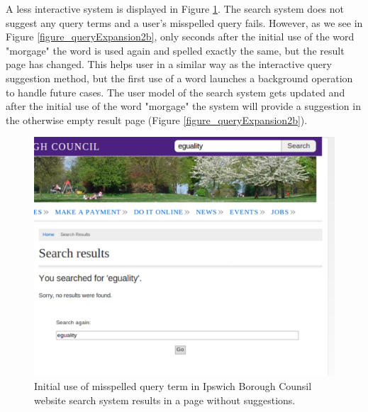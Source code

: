 \documentclass{sigchi}
\begin{document}
A less interactive system is displayed in Figure \ref{figure_queryExpansion2a}. The search system does not suggest any query terms and a user's misspelled query fails. However, as we see in Figure \ref{figure_queryExpansion2b}, only seconds after the initial use of the word "morgage" the word is used again and spelled exactly the same, but the result page has changed. This helps user in a similar way as the interactive query suggestion method, but the first use of a word launches a background operation to handle future cases. The user model of the search system gets updated and after the initial use of the word "morgage" the system will provide a suggestion in the otherwise empty result page (Figure \ref{figure_queryExpansion2b}).
\begin{figure}[htp] %
\caption{Initial use of misspelled query term in Ipswich Borough Counsil website search system results in a page without suggestions.
\protect} \label{figure_queryExpansion2a}
\includegraphics[scale=0.41]{figures/queryExpansion2a.pdf} 
\end{figure}
\end{document}
